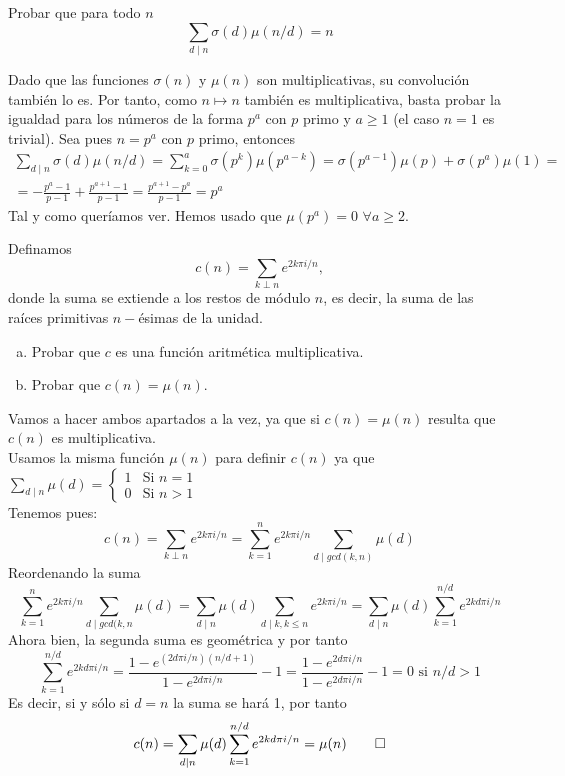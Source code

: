 \documentclass[twoside]{article}
\begin{document}
\begin{ejercicio}{3}
Probar que para todo $n$
\[
\sum_{d\mid n} \sigma(d)\mu(n/d)=n 
\]
\begin{solucion}
Dado que las funciones $\sigma(n)$ y $\mu(n)$ son multiplicativas, su convolución también lo es. Por tanto, como $n\mapsto n$ también es multiplicativa, basta probar la igualdad para los números de la forma $p^a$ con $p$ primo y $a\geq 1$ (el caso $n=1$ es trivial). Sea pues $n=p^a$ con $p$ primo, entonces
\begin{gather*}
\sum_{d\mid n} \sigma(d)\mu(n/d) = \sum_{k=0}^a \sigma(p^k)\mu(p^{a-k}) = \sigma(p^{a-1})\mu(p) + \sigma(p^a)\mu(1) = \\
=  -\frac{p^a - 1}{p-1} +\frac{p^{a+1}-1}{p-1} = \frac{p^{a+1}-p^a}{p-1} = p^a
\end{gather*}
Tal y como queríamos ver. Hemos usado que $\mu(p^a)=0$ $\forall a \geq 2$.
\end{solucion}
\end{ejercicio}
\newpage
\begin{ejercicio}{4}
Definamos $$c(n)=\sum\limits_{k\perp n} e^{2k\pi i/n},$$ donde la suma se extiende a los restos de módulo $n$, es decir, la suma de las raíces primitivas $n-$ésimas de la unidad.

\begin{enumerate}[a)]
\item Probar que $c$ es una función aritmética multiplicativa.
\item Probar que $c(n)=\mu (n)$.
\end{enumerate}

\begin{solucion}
Vamos a hacer ambos apartados a la vez, ya que si $c(n)=\mu(n)$ resulta que $c(n)$ es multiplicativa.\\
Usamos la misma función $\mu(n)$ para definir $c(n)$ ya que $\sum\limits_{d\mid n}\mu(d)=\left\lbrace\begin{array}{ll}
1 & \text{Si } n=1\\
0 & \text{Si } n>1
\end{array}\right.$\\ Tenemos pues:$$c(n)=\sum\limits_{k\perp n} e^{2k\pi i/n}=\sum\limits_{k=1}^n e^{2k\pi i/n}\sum\limits_{d\mid gcd(k,n)}\mu(d)$$ Reordenando la suma $$\sum\limits_{k=1}^n e^{2k\pi i/n}\sum\limits_{d\mid gcd(k,n}\mu(d)=\sum\limits_{d\mid n} \mu(d)\sum\limits_{d\mid k,k\leq n}e^{2k\pi i/n}=\sum\limits_{d\mid n} \mu(d)\sum\limits_{k=1}^{n/d}e^{2kd\pi i/n}$$ Ahora bien, la segunda suma es geométrica y por tanto $$\sum\limits_{k=1}^{n/d}e^{2kd\pi i/n}=\frac{1-e^{(2d\pi i/n)(n/d+1)}}{1-e^{2d\pi i/n}}-1=\frac{1-e^{2d\pi i/n}}{1-e^{2d\pi i/n}}-1=0\text{ si }n/d>1$$ Es decir, si y sólo si $d=n$ la suma se hará 1, por tanto $$c(n)=\sum\limits_{d\mid n} \mu(d)\sum\limits_{k=1}^{n/d}e^{2kd\pi i/n}=\mu(n)\qed$$
\end{solucion}
\end{ejercicio}
\newpage
\end{document}
